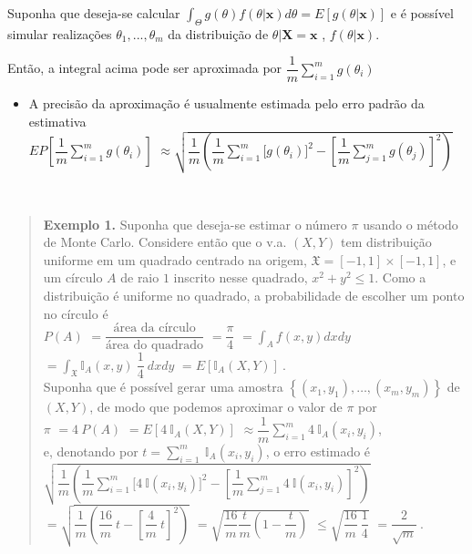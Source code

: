 \documentclass[
]{book}
\providecommand{\tightlist}{%
  \setlength{\itemsep}{0pt}\setlength{\parskip}{0pt}}
\begin{document}
Suponha que deseja-se calcular \(\displaystyle\int_\Theta g(\theta)f(\theta|\boldsymbol x)d\theta=E\left[g(\theta|\boldsymbol x)\right]\) e é possível simular realizações \(\theta_1,...,\theta_m\) da distribuição de \(\theta |\boldsymbol X=\boldsymbol x\) , \(f(\theta | \boldsymbol x)\).

Então, a integral acima pode ser aproximada por \(\displaystyle \dfrac{1}{m}\sum_{i=1}^m g(\theta_i)\)

\begin{itemize}
\tightlist
\item
  A precisão da aproximação é usualmente estimada pelo erro padrão da estimativa\\
  \(\displaystyle EP\left[\dfrac{1}{m}\sum_{i=1}^m g(\theta_i)\right]\)
  \(\approx \displaystyle \sqrt{\dfrac{1}{m}\left(\dfrac{1}{m}\sum_{i=1}^m\Big[g(\theta_i)\Big]^2-\left[\dfrac{1}{m}\sum_{j=1}^mg(\theta_j)\right]^2\right)}\)
\end{itemize}

\(~\)

\begin{quote}
\textbf{Exemplo 1.} Suponha que deseja-se estimar o número \(\pi\) usando o método de Monte Carlo. Considere então que o v.a. \((X,Y)\) tem distribuição uniforme em um quadrado centrado na origem, \(\mathfrak{X}=[-1,1]\times[-1,1]\), e um círculo \(A\) de raio \(1\) inscrito nesse quadrado, \(x^2+y^2\leq 1.\) Como a distribuição é uniforme no quadrado, a probabilidade de escolher um ponto no círculo é\\
\(P(A)\) \(=\dfrac{\text{área da círculo}}{\text{área do quadrado}}\) \(=\dfrac{\pi}{4}\) \(= \displaystyle\int_A f(x,y) dxdy\) \(= \displaystyle\int_{\mathfrak{X}} \mathbb{I}_A(x,y)~\dfrac{1}{4}~dxdy\) \(=E\left[\mathbb{I}_A(X,Y)\right]~.\)\\
Suponha que é possível gerar uma amostra \(\left\{(x_1,y_1),\ldots,(x_m,y_m)\right\}\) de \((X,Y)\), de modo que podemos aproximar o valor de \(\pi\) por\\
\(\pi\) \(=4~P(A)\) \(=E\left[4~\mathbb{I}_A(X,Y)\right]\) \(\displaystyle \approx \dfrac{1}{m}\sum_{i=1}^m 4~\mathbb{I}_A(x_i,y_i)\),\\
e, denotando por \(\displaystyle t=\sum_{i=1}^m ~\mathbb{I}_A(x_i,y_i)\), o erro estimado é\\
\(\displaystyle \sqrt{\dfrac{1}{m}\left(\dfrac{1}{m}\sum_{i=1}^m\Big[4~\mathbb{I}(x_i,y_i)\Big]^2-\left[\dfrac{1}{m}\sum_{j=1}^m 4~\mathbb{I}(x_i,y_i)\right]^2\right)}\)
\(=\displaystyle \sqrt{\dfrac{1}{m}\left(\dfrac{16}{m}~t-\left[\dfrac{4}{m}~t\right]^2\right)}\)
\(= \displaystyle \sqrt{\dfrac{16}{m} \dfrac{t}{m}\left(1-\dfrac{t}{m}\right)}\)
\(\leq \displaystyle \sqrt{\dfrac{16}{m}~\dfrac{1}{4}}\)
\(= \dfrac{2}{\sqrt{m}}~.\)
\end{quote}
\end{document}
